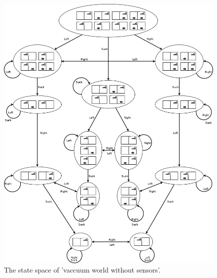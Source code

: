 \documentclass[11pt,a4paper]{scrartcl}
\begin{document}
\begin{figure}[ht]
 \includegraphics[width=.99\linewidth]{roomba.png}
 \caption{The state space of 'vaccuum world without sensors'. }
\end{figure}

%
%
\end{document}
